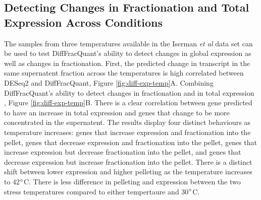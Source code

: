 \documentclass[../main.tex]{subfiles}
\begin{document}
\subsection{Detecting Changes in Fractionation and Total Expression Across Conditions}

The samples from three temperatures available in the Iserman \textit{et al} data set can be used to test DiffFracQuant's ability to detect changes in global expression as well as changes in fractionation. 
First, the predicted change in transcript in the same supernatent fraction across the temperatures is high correlated between DESeq2 and DiffFracQuant, Figure \ref{fig:diff-exp-temp}A. 
Combining DiffFracQuant's ability to detect changes in fractionation and in total expression , Figure \ref{fig:diff-exp-temp}B.
There is a clear correlation between gene predicted to have an increase in total expression and genes that change to be more concentrated in the supernatent.
The results display four distinct behaviours as temperature increases: genes that increase expression and fractionation into the pellet, genes that decrease expression and fractionation into the pellet,  genes that increase expression but decrease fractionation into the pellet, and genes that decrease expression but increase fractionation into the pellet.
There is a distinct shift between lower expression and higher pelleting as the temperature increases to 42$\degree$C.
There is less difference in pelleting and expression between the two stress temperatures compared to either tempertaure and 30$\degree$C.
\end{document}
